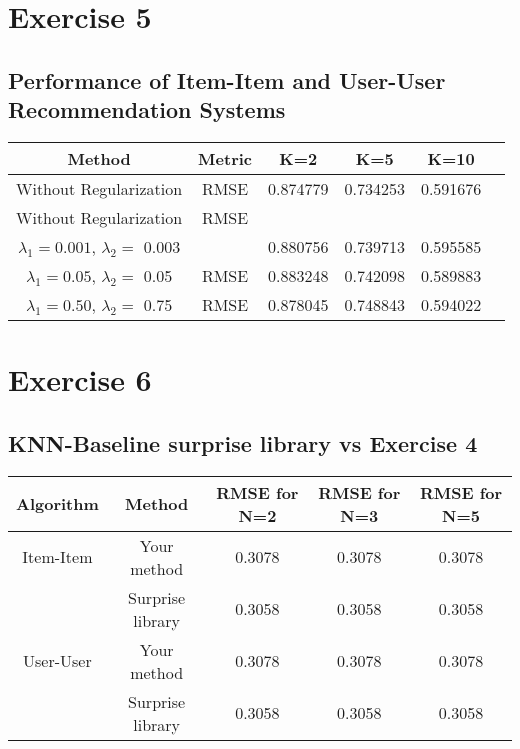 \documentclass[12pt]{article}
\begin{document}
\section*{Exercise 5}

\subsection*{Performance of Item-Item and User-User Recommendation Systems}

\begin{center}
\begin{tabular}{|c|c|c|c|c|c|}
\hline
Method & Metric & K=2 & K=5 & K=10 \\
\hline
Without Regularization & RMSE & 0.874779 & 0.734253 & 0.591676 \\
\hline
   Without Regularization  & RMSE & & & \\
   $\lambda_1 = 0.001$, $\lambda_2 =$ 0.003 & & 0.880756 & 0.739713 & 0.595585 \\ 
\hline
$ \lambda_1 = 0.05$, $\lambda_2 =$ 0.05 & RMSE & 0.883248 & 0.742098 & 0.589883 \\
\hline
$ \lambda_1 = 0.50$, $\lambda_2 =$ 0.75 & RMSE & 0.878045 & 0.748843 & 0.594022 \\
\hline
\end{tabular}
\end{center}

\section*{Exercise 6}

\subsection*{KNN-Baseline surprise library vs Exercise 4}

\begin{center}
\begin{tabular}{|c|c|c|c|c|}
\hline
Algorithm & Method & RMSE for N=2 & RMSE for N=3 & RMSE for N=5 \\
\hline
\hline
Item-Item & Your method & 0.3078 & 0.3078 & 0.3078 \\

 & Surprise library & 0.3058 & 0.3058 & 0.3058 \\
\hline
User-User & Your method & 0.3078 & 0.3078 & 0.3078 \\
 & Surprise library & 0.3058 & 0.3058 & 0.3058 \\
\hline
\end{tabular}
\end{center}
\end{document}
